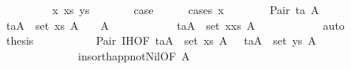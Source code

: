 \begin{isabellebody}
\ \ \isamarkupfalse%
\isanewline
\ \ \ \ \isamarkupfalse%
\ {\isacharparenleft}{\kern0pt}{}\ x\ xs\ ys{\isacharparenright}{\kern0pt}\isanewline
\ \ \ \ \isamarkupfalse%
\ \isamarkupfalse%
\ {\isacharquery}{\kern0pt}case\isanewline
\ \ \ \ \isamarkupfalse%
\ {\isacharparenleft}{\kern0pt}cases\ x{\isacharparenright}{\kern0pt}\isanewline
\ \ \ \ \ \ \isamarkupfalse%
\ {\isacharparenleft}{\kern0pt}Pair\ t\isactrlsub a\ A{\isacharparenright}{\kern0pt}\isanewline
\ \ \ \ \ \ \isamarkupfalse%
\ \isamarkupfalse%
\ {\isachardoublequoteopen}{\isasymforall}{\isacharparenleft}{\kern0pt}t\isactrlsub a{\isacharcomma}{\kern0pt}A{\isacharparenright}{\kern0pt}\ {\isasymin}\ set\ xs{\isachardot}{\kern0pt}\ A\ {\isasymnoteq}\ {\isacharbrackleft}{\kern0pt}{\isacharbrackright}{\kern0pt}{\isachardoublequoteclose}\ \ {\isachardoublequoteopen}A\ {\isasymnoteq}\ {\isacharbrackleft}{\kern0pt}{\isacharbrackright}{\kern0pt}{\isachardoublequoteclose}\isanewline
\ \ \ \ \ \ \ \ \isamarkupfalse%
\ {\isacartoucheopen}{\isasymforall}{\isacharparenleft}{\kern0pt}t\isactrlsub a{\isacharcomma}{\kern0pt}A{\isacharparenright}{\kern0pt}\ {\isasymin}\ set\ {\isacharparenleft}{\kern0pt}x{\isacharhash}{\kern0pt}xs{\isacharparenright}{\kern0pt}{\isachardot}{\kern0pt}\ A\ {\isasymnoteq}\ {\isacharbrackleft}{\kern0pt}{\isacharbrackright}{\kern0pt}{\isacartoucheclose}\isanewline
\ \ \ \ \ \ \ \ \isamarkupfalse%
\ auto\isanewline
\ \ \ \ \ \ \isamarkupfalse%
\ \isamarkupfalse%
\ {\isacharquery}{\kern0pt}thesis\ \isanewline
\ \ \ \ \ \ \ \ \isamarkupfalse%
\ Pair\ {\isachardoublequoteopen}{}{\isachardot}{\kern0pt}IH{\isachardoublequoteclose}{\isacharbrackleft}{\kern0pt}OF\ {\isacartoucheopen}{\isasymforall}{\isacharparenleft}{\kern0pt}t\isactrlsub a{\isacharcomma}{\kern0pt}A{\isacharparenright}{\kern0pt}\ {\isasymin}\ set\ xs{\isachardot}{\kern0pt}\ A\ {\isasymnoteq}\ {\isacharbrackleft}{\kern0pt}{\isacharbrackright}{\kern0pt}{\isacartoucheclose}\ {\isacartoucheopen}{\isasymforall}{\isacharparenleft}{\kern0pt}t\isactrlsub a{\isacharcomma}{\kern0pt}A{\isacharparenright}{\kern0pt}\ {\isasymin}\ set\ ys{\isachardot}{\kern0pt}\ A\ {\isasymnoteq}\ {\isacharbrackleft}{\kern0pt}{\isacharbrackright}{\kern0pt}{\isacartoucheclose}{\isacharbrackright}{\kern0pt}\isanewline
\ \ \ \ \ \ \ \ \ \ \ \ \ \ insort{\isacharunderscore}{\kern0pt}happ{\isacharunderscore}{\kern0pt}not{\isacharunderscore}{\kern0pt}Nil{\isacharbrackleft}{\kern0pt}OF\ {\isacartoucheopen}A\ {\isasymnoteq}\ {\isacharbrackleft}{\kern0pt}{\isacharbrackright}{\kern0pt}{\isacartoucheclose}{\isacharbrackright}{\kern0pt}\ \isamarkupfalse%

\end{isabellebody}
